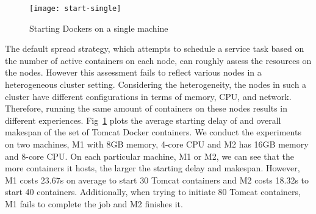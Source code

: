 \begin{figure}[ht]
\centering
\texttt{[image: start-single]}
\caption{Starting Dockers on a single machine}
\label{fig:start-single} 
\end{figure}

The default spread strategy, which 
attempts to schedule a service task based on the number of active containers on each node, 
can roughly assess the resources on the nodes. 
However this assessment fails to reflect various nodes in a heterogeneous cluster setting.
Considering the heterogeneity, the nodes in such a cluster have different configurations in terms of memory, CPU, and network.
Therefore, running the same amount of containers on these nodes results in different experiences.
Fig~\ref{fig:start-single} plots the average starting delay of and overall makespan of the set of Tomcat Docker containers. 
We conduct the experiments on two machines, M1 with 8GB memory, 4-core CPU and M2 has
16GB memory and 8-core CPU. On each particular machine, M1 or M2, we can see that the more containers it hosts, the larger the starting delay 
and makespan. However, M1 costs 23.67s on average to start 30 Tomcat containers and M2 costs 18.32s to start 40 containers. 
Additionally, when trying to initiate 80 Tomcat containers, M1 fails to complete the job and M2 finishes it. 




